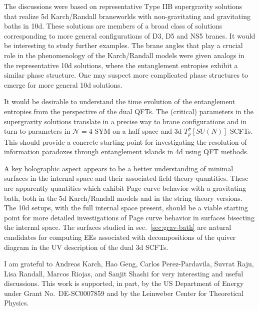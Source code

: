 \documentclass[aps,prd,11pt,notitlepage,longbibliography,nofootinbib,tightenlines,preprintnumbers]{revtex4-1}
\begin{document}
The discussions were based on representative Type IIB supergravity solutions that realize 5d Karch/Randall braneworlds with non-gravitating and gravitating baths in 10d.  
These solutions are members of a broad class of solutions corresponding to more general configurations of D3, D5 and NS5 branes. It would be interesting to study further examples.
The brane angles that play a crucial role in the phenomenology of the Karch/Randall models were given analogs in the representative 10d solutions, where the entanglement entropies exhibit a similar phase structure. One may suspect more complicated phase structures to emerge for more general 10d solutions.

It would be desirable to understand the time evolution of the entanglement entropies from the perspective of the dual QFTs.
The (critical) parameters in the supergravity solutions translate in a precise way to brane configurations and in turn to parameters in  $\mathcal N=4$ SYM on a half space and 3d $T_\rho^\sigma[SU(N)]$ SCFTs.
This should provide a concrete starting point for investigating the resolution of information paradoxes through entanglement islands in 4d using QFT methods.

A key holographic aspect appears to be a better understanding of minimal surfaces in the internal space and their associated field theory quantities. These are apparently  quantities which exhibit Page curve behavior with a gravitating bath, both in the 5d Karch/Randall models and in the string theory versions.
The 10d setups, with the full internal space present, should be a viable starting point for more detailed investigations of Page curve behavior in surfaces bisecting the internal space.
The surfaces studied in sec.~\ref{sec:grav-bath} are natural candidates for computing EEs associated with decompositions of the quiver diagram in the UV description of the dual 3d SCFTs.


\let\oldaddcontentsline\addcontentsline
\renewcommand{\addcontentsline}[3]{}
\begin{acknowledgments}
I am grateful to Andreas Karch,
Hao Geng, Carlos Perez-Pardavila, Suvrat Raju, Lisa Randall, Marcos Riojas, and
Sanjit Shashi for very interesting and useful discussions.	
This work is supported, in part, by the US Department of Energy under Grant No.~DE-SC0007859 	and by the Leinweber Center for Theoretical Physics.
\end{acknowledgments}
\let\addcontentsline\oldaddcontentsline




\end{document}
